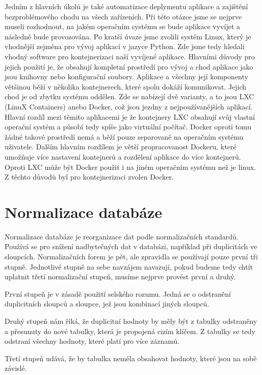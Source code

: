 Jedním z hlavních úkolů je také automatizace deplymentu aplikace a
zajištění bezproblémového chodu na všech zařízeních. Při této otázce
jsme se nejprve museli rozhodnout, na jakém operačním systému se bude
aplikace vyvíjet a následně bude provozována. Po kratší úvaze jsme
zvolili systém Linux, který je vhodnější zejména pro vývoj aplikací v
jazyce Python. Zde jsme tedy hledali vhodný software pro
kontejnerizaci naší vyvíjené aplikace. Hlavními důvody pro jejich
použití je, že obsahují kompletní prostředí pro vývoj a chod aplikace
jako jsou knihovny nebo konfigurační soubory. Aplikace a všechny její
komponenty většinou běží v několika kontejnerech, které spolu dokáží
komunikovat. Jejich chod je od zbytku systému oddělen. Zde se nabízejí
dvě varianty, a to jsou LXC (LinuX Containers) anebo Docker, což jsou
jezdny z nejpoužívanějších aplikací. Hlavní rozdíl mezi těmito
aplikacemi je že kontejnery LXC obsahují svůj vlastní operační systém
a působí tedy spíše jako virtuální počítač. Docker oproti tomu žádné
takové prostředí nemá a běží pouze separovaně na operačním systému
uživatele. Dalším hlavním rozdílem je větší propracovanost Dockeru,
které umožňuje více nastavení kontejnerů a rozdělení aplikace do více
kontejnerů. Oproti LXC může být Docker použit i na
jiném operačním systému než je linux. Z těchto důvodů byl pro
kontejnerizaci zvolen Docker.

\section{Normalizace databáze}

Normalizace databáze je reorganizace dat podle normalizačních standardů. 
Používá se pro snížení nadbytečných dat v databázi, například při duplicitách 
ve sloupcích. Normalizačních forem je pět, ale zpravidla se používají pouze 
první tři stupně. Jednotlivé stupně na sebe navzájem navazují, pokud budeme 
tedy chtít uplatnit třetí normalizační stupeň, musíme nejprve provést první a druhý.

První stupeň je v zásadě použití selského rozumu. Jedná se o odstranění 
duplicitních sloupců a sloupce, jež jsou kombinací jiných sloupců.

Druhý stupeň nám říká, že duplicitní hodnoty by měly být z tabulky odstraněny 
a přesunuty do nové tabulky, která je propojená cizím klíčem. Z tabulky se tedy 
odstraní všechny hodnoty, které platí pro více záznamů.

Třetí stupeň udává, že by tabulka neměla obsahovat hodnoty, které jsou na sobě závislé. 

